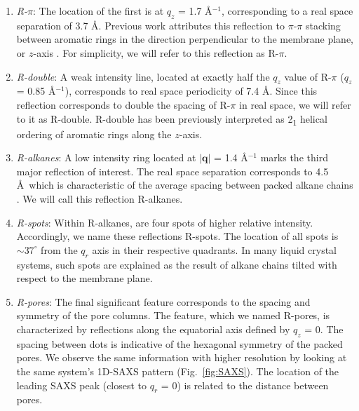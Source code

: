   \begin{enumerate} 
  
	\item \textit{R-$\pi$}: The location of the first is at $q_z$ = 1.7
	\AA$^{-1}$, corresponding to a real space separation of 3.7 {\AA}. Previous
	work attributes this reflection to $\pi$-$\pi$
	stacking between aromatic rings in the direction perpendicular to the membrane
	plane, or $z$-axis \cite{feng_scalable_2014}. For simplicity, we will refer to
	this reflection as R-$\pi$.
 
	\item \textit{R-double}: A weak intensity line, located at exactly half
	the $q_z$ value of R-$\pi$ ($q_z$ = 0.85 \AA$^{-1}$), corresponds to real
	space periodicity of 7.4 \AA. Since this reflection corresponds to double
	the spacing of R-$\pi$ in real space, we will refer to it as R-double. 
	R-double has been previously interpreted as 2\textsubscript{1} helical ordering of aromatic
	rings along the $z$-axis\cite{feng_scalable_2014}.

	\item \textit{R-alkanes}: A low intensity ring located at $|\mathbf{q}|$ = 1.4
	\AA$^{-1}$ marks the third major reflection of interest. The real space
	separation corresponds to 4.5 \AA~which is characteristic of the average
	spacing between packed alkane chains \cite{mcintosh_organization_1980}. We will
	call this reflection R-alkanes.

	\item \textit{R-spots}: Within R-alkanes, are four spots of higher
	relative intensity.  Accordingly, we name these reflections R-spots. The
	location of all spots is $\sim37^{\circ}$ from the $q_r$ axis in their
	respective quadrants. In many liquid crystal systems, such spots are explained
	as the result of alkane chains tilted with respect to the membrane
	plane\cite{govind_simple_2001}.
 
	\item \textit{R-pores}: The final significant feature corresponds to the spacing
	and symmetry of the pore columns. The feature, which we named R-pores,
	is characterized by reflections along the equatorial axis defined by $q_z$ = 0.
	The spacing between dots is indicative of the hexagonal symmetry of the packed
	pores. We observe the same information with higher resolution by looking at the
	same system's 1D-SAXS pattern (Fig.~\ref{fig:SAXS}). The location of the
	leading SAXS peak (closest to $q_r$ = 0) is related to the distance between
	pores.
	
  \end{enumerate}

